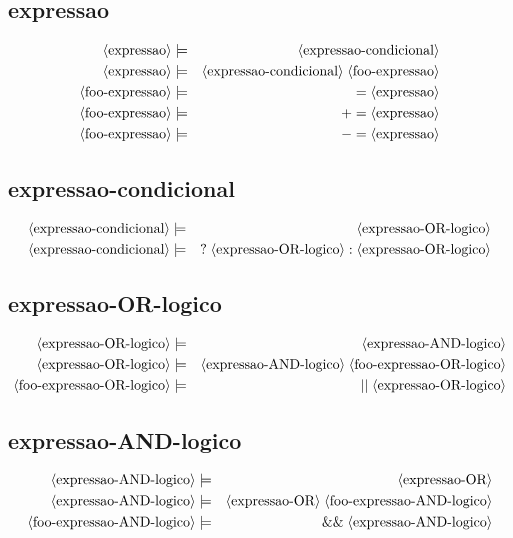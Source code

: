 \documentclass[12pt,a4papper]{article}
\newcommand{\pn}[1]{\langle \textnormal{#1} \rangle}
\newcommand{\pp}{\models}
\newcommand{\ww}{\;}
\newcommand{\sm}[1]{\textnormal{#1}}
\begin{document}
\begin{landscape}
\subsection{expressao}
\begin{eqnarray}
\pn{expressao} &\pp& \pn{expressao-condicional} \\
\pn{expressao} &\pp& \pn{expressao-condicional} \ww \pn{foo-expressao} \\
          \pn{foo-expressao} &\pp& \sm{$=$} \ww \pn{expressao} \\
          \pn{foo-expressao} &\pp& \sm{$+=$} \ww \pn{expressao} \\
          \pn{foo-expressao} &\pp& \sm{$-=$} \ww \pn{expressao} \\
\end{eqnarray}


\subsection{expressao-condicional}
\begin{eqnarray}
\pn{expressao-condicional} &\pp& \pn{expressao-OR-logico} \\
\pn{expressao-condicional} &\pp& \sm{?} \ww \pn{expressao-OR-logico} \ww \sm{:} \ww \pn{expressao-OR-logico}
\end{eqnarray}


\subsection{expressao-OR-logico}
\begin{eqnarray}
\pn{expressao-OR-logico} &\pp& \pn{expressao-AND-logico} \\
\pn{expressao-OR-logico} &\pp& \pn{expressao-AND-logico} \ww \pn{foo-expressao-OR-logico} \\
\pn{foo-expressao-OR-logico} &\pp& \sm{$\mid\mid$} \ww \pn{expressao-OR-logico} 
\end{eqnarray}


\subsection{expressao-AND-logico}
\begin{eqnarray}
\pn{expressao-AND-logico} &\pp& \pn{expressao-OR} \\
\pn{expressao-AND-logico} &\pp& \pn{expressao-OR} \ww \pn{foo-expressao-AND-logico} \\
\pn{foo-expressao-AND-logico} &\pp& \sm{\&\&} \ww \pn{expressao-AND-logico} 
\end{eqnarray}



\end{landscape}
\end{document}
